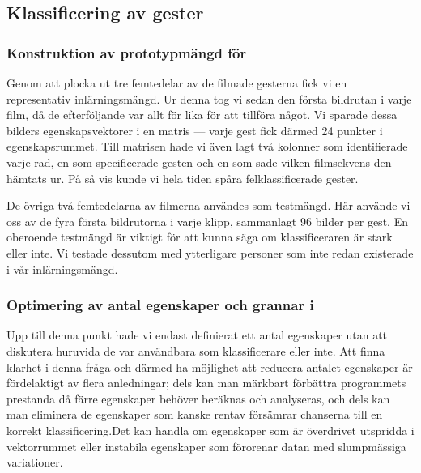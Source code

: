 \documentclass[../rapport_MVEX01-11-05]{subfiles}
\begin{document}
\subsection{Klassificering av gester} 

\subsubsection{Konstruktion av prototypmängd för \knn}
Genom att plocka ut tre femtedelar av de filmade gesterna fick vi en
representativ inlärningsmängd. Ur denna tog vi sedan den första bildrutan i
varje film, då de efterföljande var allt för lika för att tillföra något. Vi
sparade dessa bilders egenskapsvektorer i en matris --- varje gest 
fick därmed 24 punkter i
egenskapsrummet. Till matrisen hade vi även lagt två kolonner som identifierade
varje rad, en som specificerade gesten och en som sade vilken filmsekvens den
hämtats ur. På så vis kunde vi hela tiden spåra felklassificerade gester.

De övriga två femtedelarna av filmerna användes som testmängd. Här använde vi oss
av de fyra första bildrutorna i varje klipp, sammanlagt 96 bilder per gest.
En oberoende testmängd är viktigt för att kunna säga om klassificeraren är
stark eller inte. Vi testade dessutom med ytterligare personer som
inte redan existerade i vår inlärningsmängd.

%

\subsubsection{Optimering av antal egenskaper och grannar i \knn}
Upp till denna punkt hade vi endast definierat ett antal egenskaper utan att
diskutera huruvida de var användbara som klassificerare eller inte. Att finna
klarhet i denna fråga och därmed ha möjlighet att reducera antalet egenskaper är
fördelaktigt av flera anledningar; dels kan man märkbart förbättra programmets
prestanda då färre egenskaper behöver beräknas och analyseras, och dels kan man
eliminera de egenskaper som kanske rentav försämrar chanserna till en korrekt
klassificering.Det kan handla om egenskaper som är överdrivet utspridda i
vektorrummet eller instabila egenskaper som förorenar datan med slumpmässiga
variationer.
\end{document}
